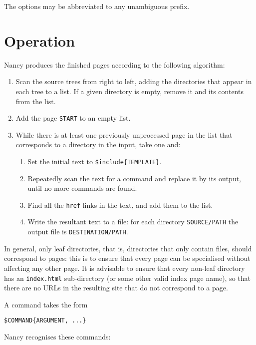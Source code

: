 \documentclass[english]{scrartcl}
\begin{document}
The options may be abbreviated to any unambiguous prefix.

\section{Operation}
\label{operation}

Nancy produces the finished pages according to the following algorithm:

\begin{enumerate}
\item Scan the source trees from right to left, adding the directories that appear in each tree to a list. If a given directory is empty, remove it and its contents from the list.
\item Add the page \verb|START| to an empty list.
\item While there is at least one previously unprocessed page in the list that corresponds to a directory in the input, take one and:
\begin{enumerate}
\item Set the initial text to \verb|$include{TEMPLATE}|.
\item Repeatedly scan the text for a command and replace it by its output, until no more commands are found.
\item Find all the \verb|href| links in the text, and add them to the list.
\item Write the resultant text to a file: for each directory \verb|SOURCE/PATH| the output file is \verb|DESTINATION/PATH|.
\end{enumerate}
\end{enumerate}

In general, only leaf directories, that is, directories that only contain files, should correspond to pages: this is to ensure that every page can be specialised without affecting any other page. It is advisable to ensure that every non-leaf directory has an \verb|index.html| sub-directory (or some other valid index page name), so that there are no URLs in the resulting site that do not correspond to a page.

A command takes the form

\begin{verbatim}
$COMMAND{ARGUMENT, ...}
\end{verbatim}

Nancy recognises these commands:
\end{document}
